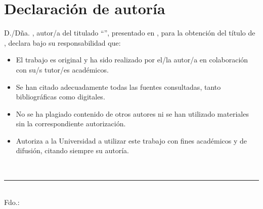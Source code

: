 \chapter*{Declaración de autoría}

\vspace{1em}

D./Dña. \textbf{\memAutor}, autor/a del \memTipoTrabajo{}
titulado \enquote{\memTitulo}, presentado
en \memCiudad, \memFecha{} para la obtención del título de
\memTitulacion, declara bajo su responsabilidad que:

\vspace{0.5em}

\begin{itemize}
  \item El trabajo es original y ha sido realizado por el/la autor/a en
        colaboración con su/s tutor/es académicos.
  \item Se han citado adecuadamente todas las fuentes consultadas, tanto
        bibliográficas como digitales.
  \item No se ha plagiado contenido de otros autores ni se han utilizado
        materiales sin la correspondiente autorización.
  \item Autoriza a la Universidad a utilizar este trabajo con fines
        académicos y de difusión, citando siempre su autoría.
\end{itemize}

\vspace{2em}

\begin{flushright}
\textit{}\\[3em]

\rule{6cm}{0.4pt}\\
Fdo.: \memAutor
\end{flushright}
